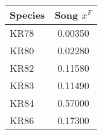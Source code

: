 \begin{tabular}{|l||c|}
\hline
\bf{Species} & \bf{Song $x^F$} \\ 
\hline
KR78 & 0.00350 \\ 
\hline
KR80 & 0.02280 \\ 
\hline
KR82 & 0.11580 \\ 
\hline
KR83 & 0.11490 \\ 
\hline
KR84 & 0.57000 \\ 
\hline
KR86 & 0.17300 \\ 
\hline
\end{tabular}
